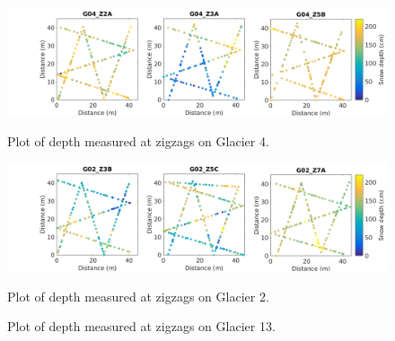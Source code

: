 \documentclass[12pt]{article}
\begin{document}
\begin{landscape}
\begin{figure}
	\centering
	\includegraphics[width = 23 cm]{ZigzagDepth_G04.png}\\
	\caption{Plot of depth measured at zigzags on Glacier 4.}
	\label{fig:ZZ_G04}
\end{figure}

\begin{figure}
	\centering
	\includegraphics[width = 23 cm]{ZigzagDepth_G02.png}\\
	\caption{Plot of depth measured at zigzags on Glacier 2.}
	\label{fig:ZZ_G02}
\end{figure}
\end{landscape}

\begin{figure}[H] 
	\centering
	\caption{Plot of depth measured at zigzags on Glacier 13.}
	\label{fig:ZZ_G13}
\end{figure}
\end{document}
